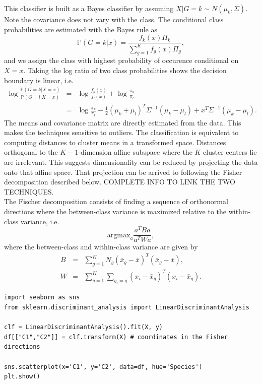 \documentclass[]{article}
\begin{document}
This classifier is built as a Bayes classifier by assuming $X|G=k\sim N(\mu_k, \Sigma)$. Note the covariance does not vary with the class. The conditional class probabilities are estimated with the Bayes rule as
\begin{equation}
\mathbb{P}(G=k|x)=\frac{f_k(x)\Pi_k}{\sum_{g=1}^K f_g(x)\Pi_g},
\end{equation}
and we assign the class with highest probability of occurence conditional on $X=x$. Taking the log ratio of two class probabilities shows the decision boundary is linear, i.e.
\begin{eqnarray}
\log \frac{\mathbb{P}(G=k|X=x)}{\mathbb{P}(G=l|X=x)}&=&\log\frac{f_k(x)}{f_l(x)}+\log\frac{\pi_k}{\pi_l}\\
&=&\log\frac{\pi_k}{\pi_l}-\frac{1}{2}(\mu_k+\mu_l)^T\Sigma^{-1}(\mu_k-\mu_l)+x^T\Sigma^{-1}(\mu_k-\mu_l).
\end{eqnarray}
The means and covariance matrix are directly estimated from the data. This makes the techniques sensitive to outliers. The classification is equivalent to computing distances to cluster means in a transformed space. Distances orthogonal to the $K-1$-dimension affine subspace where the $K$ cluster centers lie are irrelevant. This suggests dimensionality can be reduced by projecting the data onto that affine space. That projection can be arrived to following the Fisher decomposition described below. COMPLETE INFO TO LINK THE TWO TECHNIQUES.\\

\noindent The Fischer decomposition consists of finding a sequence of orthonormal directions where the between-class variance is maximized relative to the within-class variance, i.e.
\begin{equation}
\mathrm{argmax}_a \frac{a^T B a}{a^T W a},
\end{equation}
where the between-class and within-class variance are given by
\begin{eqnarray}
B&=&\sum_{g=1}^K N_g (\bar{x}_g-\bar{x})^T (\bar{x}_g-\bar{x}), \\
W&=&\sum_{g=1}^K \sum_{g_i=g} (x_i-\bar{x}_g)^T (x_i-\bar{x}_g).
\end{eqnarray}

\begin{lstlisting}
import seaborn as sns
from sklearn.discriminant_analysis import LinearDiscriminantAnalysis

clf = LinearDiscriminantAnalysis().fit(X, y)
df[["C1","C2"]] = clf.transform(X) # coordinates in the Fisher directions

sns.scatterplot(x='C1', y='C2', data=df, hue='Species')
plt.show()
\end{lstlisting}
\end{document}
